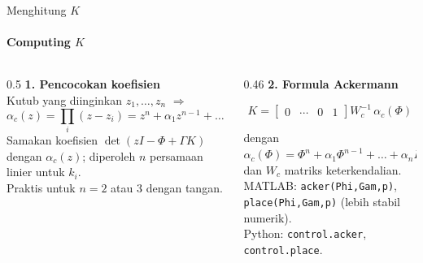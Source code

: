 \documentclass[aspectratio=169,10pt]{beamer}
\begin{document}
\begin{frame}{Menghitung $K$}
	\framesubtitle{Computing $K$}
	\begin{columns}[T]
		\begin{column}{0.5\textwidth}
			\small
			\textbf{1. Pencocokan koefisien}\\
			Kutub yang diinginkan $z_1,\dots,z_n$ $\Rightarrow$
			\[
				\alpha_c(z) = \prod_i (z - z_i) = z^n + \alpha_1z^{n-1} + \dots + \alpha_n
			\]
			Samakan koefisien $\det(zI - \Phi + \Gamma K)$ dengan $\alpha_c(z)$; diperoleh $n$ persamaan linier untuk $k_i$.\\[4pt]
			Praktis untuk $n=2$ atau 3 dengan tangan.
		\end{column}
		\begin{column}{0.46\textwidth}
			\small
			\textbf{2. Formula Ackermann}
			\begin{block}{}
				\[
					K = \begin{bmatrix}0 & \cdots & 0 & 1\end{bmatrix} W_c^{-1}\,\alpha_c(\Phi)
				\]
			\end{block}
			dengan $\alpha_c(\Phi) = \Phi^n + \alpha_1\Phi^{n-1} + \dots + \alpha_nI$ dan $W_c$ matriks keterkendalian.\\[4pt]
			{\scriptsize MATLAB: \texttt{acker(Phi,Gam,p)}, \texttt{place(Phi,Gam,p)} (lebih stabil numerik).\\
			Python: \texttt{control.acker}, \texttt{control.place}.}
		\end{column}
	\end{columns}
\end{frame}
\end{document}
